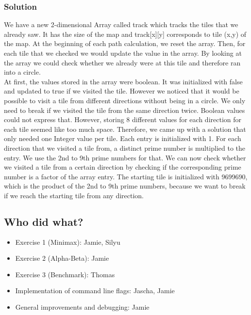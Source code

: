 \subsubsection{Solution}
We have a new 2-dimensional Array called track which tracks the tiles that we already saw. It has the size of the map and track[x][y] corresponds to tile (x,y) of the map. At the beginning of each path calculation, we reset the array. Then, for each tile that we checked we would update the value in the array. By looking at the array we could check whether we already were at this tile and therefore ran into a circle.\\
At first, the values stored in the array were boolean. It was initialized with false and updated to true if we visited the tile. However we noticed that it would be possible to visit a tile from different directions without being in a circle. We only need to break if we visited the tile from the same direction twice. Boolean values could not express that. However, storing 8 different values for each direction for each tile seemed like too much space. Therefore, we came up with a solution that only needed one Integer value per tile. Each entry is initialized with 1. For each direction that we visited a tile from, a distinct prime number is multiplied to the entry. We use the 2nd to 9th prime numbers for that. We can now check whether we visited a tile from a certain direction by checking if the corresponding prime number is a factor of the array entry. The starting tile is initialized with 9699690, which is the product of the 2nd to 9th prime numbers, because we want to break if we reach the starting tile from any direction.

\subsection{Who did what?}
\begin{itemize}
    \item Exercise 1 (Minimax): Jamie, Silyu
    \item Exercise 2 (Alpha-Beta): Jamie
    \item Exercise 3 (Benchmark): Thomas
    \item Implementation of command line flags: Jascha, Jamie
    \item General improvements and debugging: Jamie
\end{itemize}